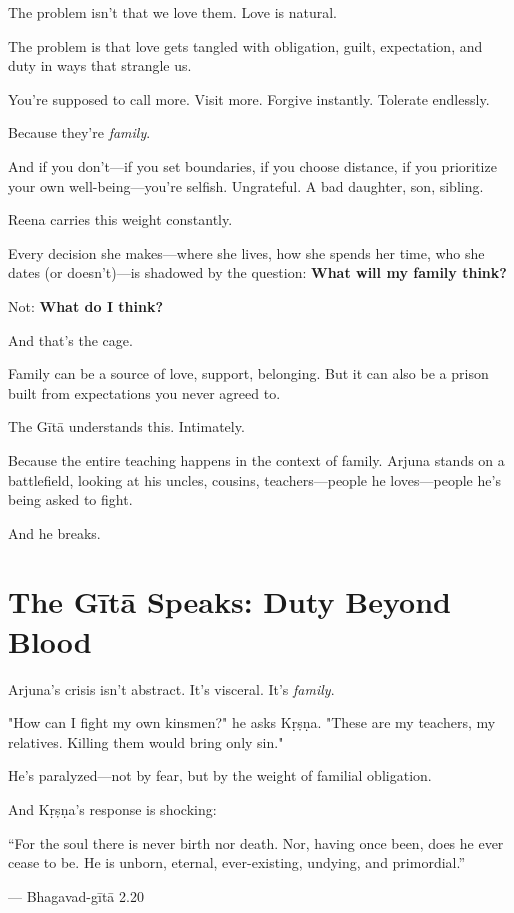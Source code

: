 \documentclass[11pt,twoside]{book}
\begin{document}
The problem isn't that we love them. Love is natural.

The problem is that love gets tangled with obligation, guilt, expectation, and duty in ways that strangle us.

You're supposed to call more. Visit more. Forgive instantly. Tolerate endlessly.

Because they're \emph{family}.

And if you don't—if you set boundaries, if you choose distance, if you prioritize your own well-being—you're selfish. Ungrateful. A bad daughter, son, sibling.

Reena carries this weight constantly.

Every decision she makes—where she lives, how she spends her time, who she dates (or doesn't)—is shadowed by the question: \textbf{What will my family think?}

Not: \textbf{What do I think?}

And that's the cage.

Family can be a source of love, support, belonging. But it can also be a prison built from expectations you never agreed to.

The Gītā understands this. Intimately.

Because the entire teaching happens in the context of family. Arjuna stands on a battlefield, looking at his uncles, cousins, teachers—people he loves—people he's being asked to fight.

And he breaks.

\section*{The Gītā Speaks: Duty Beyond Blood}

Arjuna's crisis isn't abstract. It's visceral. It's \emph{family}.

"How can I fight my own kinsmen?" he asks Kṛṣṇa. "These are my teachers, my relatives. Killing them would bring only sin."

He's paralyzed—not by fear, but by the weight of familial obligation.

And Kṛṣṇa's response is shocking:

\begin{pullquote}
``For the soul there is never birth nor death. Nor, having once been, does he ever cease to be. He is unborn, eternal, ever-existing, undying, and primordial.''

--- Bhagavad-gītā 2.20
\end{pullquote}
\end{document}
